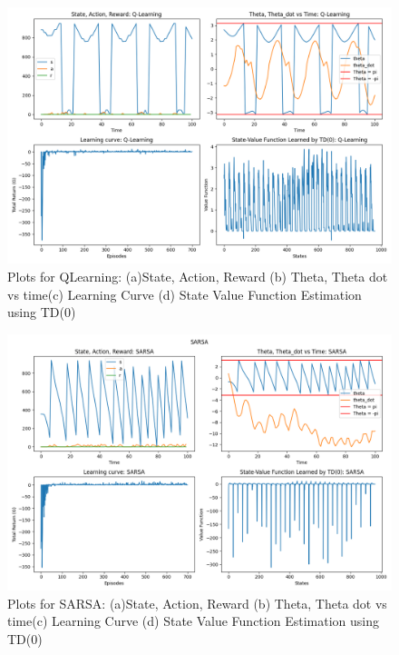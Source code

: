 \documentclass[conf]{new-aiaa}
\begin{document}
\begin{figure}[H]
\centering
\includegraphics[width=30pc]{figs/pen/subplots_qlearning.png}
\caption{Plots for QLearning: (a)State, Action, Reward (b) Theta, Theta dot vs time(c) Learning Curve (d) State Value Function Estimation using TD(0)}
\label{fig_env1}
\end{figure}


\begin{figure}[H]
\centering
\includegraphics[width=30pc]{figs/pen/sarsa_plots.png}
\caption{Plots for SARSA: (a)State, Action, Reward (b) Theta, Theta dot vs time(c) Learning Curve (d) State Value Function Estimation using TD(0)}
\label{fig_env1}
\end{figure}
\end{document}
